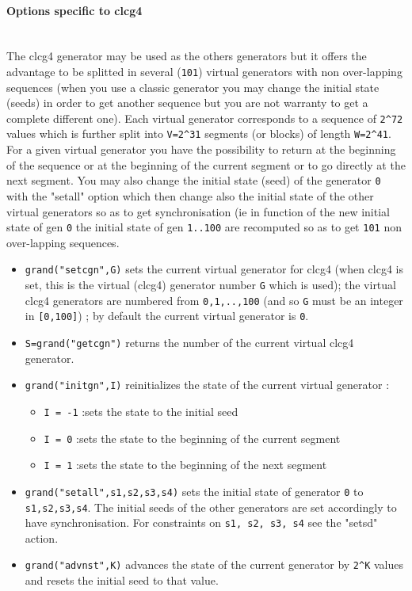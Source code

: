 \paragraph{Options specific to clcg4}
~~\\

The clcg4 generator may be used as the others generators but it offers the advantage 
to be splitted in several (\verb!101!) virtual generators with non over-lapping 
sequences (when you use a classic generator you may change the initial state (seeds) 
in order to get another sequence but you are not warranty to get a complete  different one). 
Each virtual generator corresponds to a sequence of \verb!2^72! values which is 
further split into \verb!V=2^31! segments (or blocks) of length \verb!W=2^41!.
For a given virtual generator you have the possibility to return at the beginning of the 
sequence or at the beginning of the current segment or to go directly at the next segment. 
You may also change the initial state (seed) of the generator \verb!0! with the 
"setall" option which then change also the initial state of the other virtual generators 
so as to get synchronisation (ie in function of the new initial state of gen \verb!0! 
the initial state of gen \verb!1..100! are recomputed so as to get \verb!101! 
non over-lapping sequences.   

\begin{itemize}
\item {} \verb!grand("setcgn",G)! sets the current virtual generator for clcg4 (when clcg4
  is set, this is the virtual (clcg4) generator number \verb!G! which is used);  the virtual clcg4 
  generators are numbered from \verb!0,1,..,100! (and so \verb!G! must be an integer 
  in  \verb![0,100]!) ; by default the current virtual generator is \verb!0!.
\item {} \verb!S=grand("getcgn")! returns the number of the current virtual clcg4 generator.
\item {} \verb!grand("initgn",I)!
  reinitializes the state of the current virtual generator :
      \begin{itemize}
      \item \verb!I = -1! :sets the state to the initial seed
      \item \verb!I = 0! :sets the state to the beginning of the current segment
      \item \verb!I = 1! :sets the state to the beginning of the next segment
      \end{itemize}
\item {} \verb!grand("setall",s1,s2,s3,s4)! sets the initial state of generator \verb!0! 
  to \verb!s1,s2,s3,s4!. The initial seeds of the other generators are set accordingly 
  to have synchronisation. For constraints on \verb!s1, s2, s3, s4! see the "setsd" action.
\item {} \verb!grand("advnst",K)! advances the state of the current generator by \verb!2^K! values 
  and  resets the initial seed to that value. 
\end{itemize}


